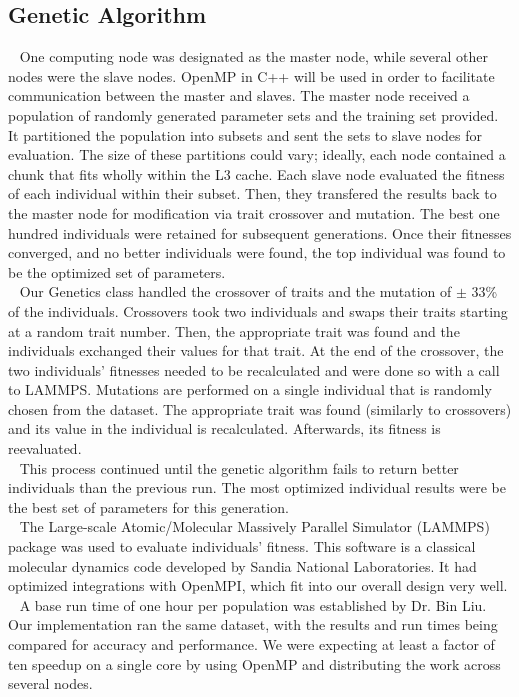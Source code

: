 \documentclass[letterpaper, 12pt]{article}
\begin{document}
\begin{flushleft}
\subsection*{Genetic Algorithm}

~\newline
One computing node was designated as the master node, while several other nodes were the slave nodes.  OpenMP in C++ will be used in order to facilitate communication between the master and slaves. The master node received a population of randomly generated parameter sets and the training set provided.  It partitioned the population into subsets and sent the sets to slave nodes for evaluation.  The size of these partitions could vary; ideally, each node contained a chunk that fits wholly within the L3 cache. Each slave node evaluated the fitness of each individual within their subset. Then, they transfered the results back to the  master node for modification via trait crossover and mutation. The best one hundred individuals were retained for subsequent generations.  Once their fitnesses converged, and no better individuals were found, the top individual was found to be the optimized set of parameters.\\

~\newline
Our Genetics class handled the crossover of traits and the mutation of $\pm$ 33\% of the individuals.  Crossovers took two individuals and swaps their traits starting at a random trait number.  Then, the appropriate trait was found and the individuals exchanged their values for that trait.  At the end of the crossover, the two individuals' fitnesses needed to be recalculated and were done so with a call to LAMMPS.  Mutations are performed on a single individual that is randomly chosen from the dataset.  The appropriate trait was found (similarly to crossovers) and its value in the individual is recalculated.  Afterwards, its fitness is reevaluated. \\

~\newline 
This process continued until the genetic algorithm fails to return better individuals than the previous run. The most optimized individual results were be the best set of parameters for this generation. \\
~\newline
The Large-scale Atomic/Molecular Massively Parallel Simulator (LAMMPS) package was used to evaluate individuals' fitness.  This software is a classical molecular dynamics code developed by Sandia National Laboratories.  It had optimized integrations with OpenMPI, which fit into our overall design very well. \\
~\newline 
A base run time of one hour per population was established by Dr. Bin Liu.  Our implementation ran the same dataset, with the results and run times being compared for accuracy and performance.  We were expecting at least a factor of ten speedup on a single core by using OpenMP and distributing the work across several nodes.\\


\end{flushleft}
\end{document}
